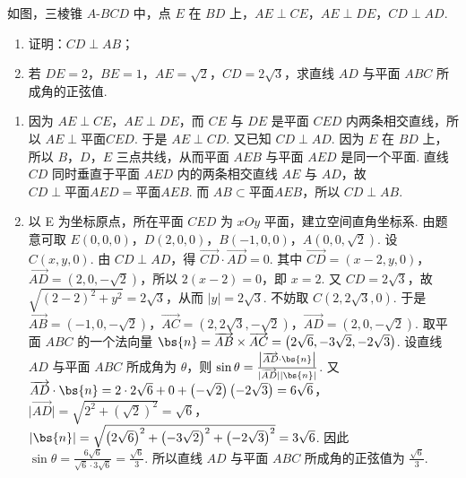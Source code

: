 \documentclass[UTF8,a4paper,oneside,11pt]{ctexbook}
\begin{document}
\begin{problem}
如图，三棱锥 \(A\)-\(BCD\) 中，点 \(E\) 在 \(BD\) 上，\(AE\perp CE\)，\(AE\perp DE\)，\(CD\perp AD\).

\begin{enumerate}
\item 证明：\(CD\perp AB\)；
\item 若 \(DE=2\)，\(BE=1\)，\(AE=\sqrt{2}\)，\(CD=2\sqrt{3}\)，求直线 \(AD\) 与平面 \(ABC\) 所成角的正弦值.
\end{enumerate}

\end{problem}

\begin{solution}
\begin{enumerate}
\item 因为 \(AE\perp CE\)，\(AE\perp DE\)，而 \(CE\) 与 \(DE\) 是平面 \(CED\) 内两条相交直线，所以 \(AE\perp \text{平面} CED\). 于是 \(AE\perp CD\).
又已知 \(CD\perp AD\). 因为 \(E\) 在 \(BD\) 上，所以 \(B\)，\(D\)，\(E\) 三点共线，从而平面 \(AEB\) 与平面 \(AED\) 是同一个平面. 直线 \(CD\) 同时垂直于平面 \(AED\) 内的两条相交直线 \(AE\) 与 \(AD\)，故 \(CD\perp \text{平面} AED=\text{平面} AEB\). 而 \(AB\subset \text{平面} AEB\)，所以 \(CD\perp AB\).

\item 以 E 为坐标原点，所在平面 \(CED\) 为 \(xOy\) 平面，建立空间直角坐标系. 由题意可取 \(E(0,0,0)\)，\(D(2,0,0)\)，\(B(-1,0,0)\)，\(A(0,0,\sqrt{2})\). 设 \(C(x,y,0)\).
由 \(CD\perp AD\)，得 \(\overrightarrow{CD}\cdot \overrightarrow{AD}=0\). 其中 \(\overrightarrow{CD}=(x-2,y,0)\)，\(\overrightarrow{AD}=(2,0,-\sqrt{2})\)，所以 \(2\left( x-2 \right)=0\)，即 \(x=2\). 又 \(CD=2\sqrt{3}\)，故 \(\sqrt{\left( 2-2 \right)^2+y^2}=2\sqrt{3}\)，从而 \(\lvert y \rvert=2\sqrt{3}\). 不妨取 \(C(2,2\sqrt{3},0)\).
于是 \(\overrightarrow{AB}=(-1,0,-\sqrt{2})\)，\(\overrightarrow{AC}=(2,2\sqrt{3},-\sqrt{2})\)，\(\overrightarrow{AD}=(2,0,-\sqrt{2})\). 取平面 \(ABC\) 的一个法向量 \(\bs{n}=\overrightarrow{AB}\times \overrightarrow{AC}=\left( 2\sqrt{6},-3\sqrt{2},-2\sqrt{3} \right)\). 设直线 \(AD\) 与平面 \(ABC\) 所成角为 \(\theta\)，则 \(\sin \theta=\frac{\left| \overrightarrow{AD}\cdot \bs{n} \right|}{\lvert \overrightarrow{AD} \rvert \lvert \bs{n} \rvert}\). 又 \(\overrightarrow{AD}\cdot \bs{n}=2\cdot 2\sqrt{6}+0+\left( -\sqrt{2} \right)\left( -2\sqrt{3} \right)=6\sqrt{6}\)，\(\lvert \overrightarrow{AD} \rvert=\sqrt{2^2+\left( \sqrt{2} \right)^2}=\sqrt{6}\)，\(\lvert \bs{n} \rvert=\sqrt{\left( 2\sqrt{6} \right)^2+\left( -3\sqrt{2} \right)^2+\left( -2\sqrt{3} \right)^2}=3\sqrt{6}\). 因此 \(\sin \theta=\frac{6\sqrt{6}}{\sqrt{6}\cdot 3\sqrt{6}}=\frac{\sqrt{6}}{3}\). 所以直线 \(AD\) 与平面 \(ABC\) 所成角的正弦值为 \(\frac{\sqrt{6}}{3}\).
\end{enumerate}
\end{solution}
\end{document}
